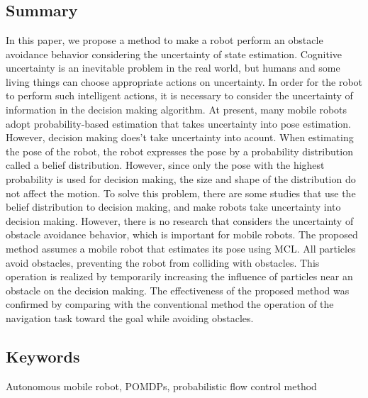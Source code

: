 \chapter*{}

\section*{Summary}
In this paper, we propose a method to make a robot perform an obstacle avoidance behavior considering the uncertainty of state estimation.
Cognitive uncertainty is an inevitable problem in the real world, but humans and some living things can choose appropriate actions on uncertainty.
In order for the robot to perform such intelligent actions, it is necessary to consider the uncertainty of information in the decision making algorithm.
At present, many mobile robots adopt probability-based estimation that takes uncertainty into pose estimation.
However, decision making does’t take uncertainty into acount.
When estimating the pose of the robot, the robot expresses the pose by a probability distribution called a belief distribution.
However, since only the pose with the highest probability is used for decision making, the size and shape of the distribution do not affect the motion.
To solve this problem, there are some studies that use the belief distribution to decision making, and make robots take uncertainty into decision making.
However, there is no research that considers the uncertainty of obstacle avoidance behavior, which is important for mobile robots.
The proposed method assumes a mobile robot that estimates its pose using MCL.
All particles avoid obstacles, preventing the robot from colliding with obstacles.
This operation is realized by temporarily increasing the influence of particles near an obstacle on the decision making.
The effectiveness of the proposed method was confirmed by comparing with the conventional method the operation of the navigation task toward the goal while avoiding obstacles.

\section*{Keywords}
Autonomous mobile robot, POMDPs, probabilistic flow control method
